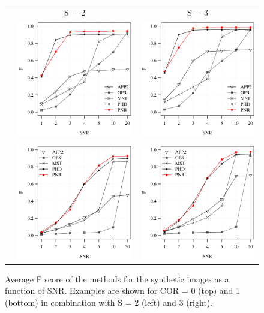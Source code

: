 \begin{figure}
	\centering\tiny
	\begin{tabular}{ccc}
		& \hspace{3.5em}S = 2 & \hspace{3.5em}S = 3 \\[0.5em]
		\rotatebox{90}{\hspace{0.5em}COR = 0} &
		\includegraphics[align=c,width=0.25\columnwidth]{fig6a} &
		\includegraphics[align=c,width=0.25\columnwidth]{fig6b} \\
		\\[0.01\columnwidth]
		\rotatebox{90}{\hspace{0.5em}COR = 1} &
		\includegraphics[align=c,width=0.25\columnwidth]{fig6c} &
		\includegraphics[align=c,width=0.25\columnwidth]{fig6d}
	\end{tabular}
	\caption{Average F score of the methods for the synthetic images as a function of SNR. Examples are shown for COR = 0 (top) and 1 (bottom) in combination with S = 2 (left) and 3 (right).}
	\label{fig6}
\end{figure}
